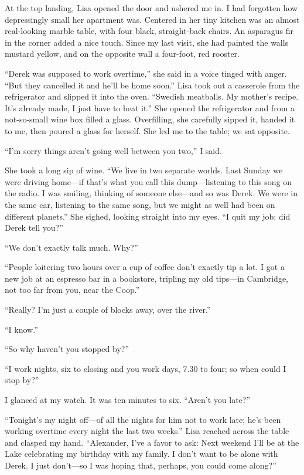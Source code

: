 At the top landing, Lisa opened the door and ushered me in. I had
forgotten how depressingly small her apartment was. Centered in her tiny
kitchen was an almost real-looking marble table, with four black,
straight-back chairs. An asparagus fir in the corner added a nice touch.
Since my last visit, she had painted the walls mustard yellow, and on
the opposite wall a four-foot, red rooster.

``Derek was supposed to work overtime,'' she said in a voice tinged with
anger. ``But they cancelled it and he'll be home soon.'' Lisa took out a
casserole from the refrigerator and slipped it into the oven. ``Swedish
meatballs. My mother's recipe. It's already made, I just have to heat
it.'' She opened the refrigerator and from a not-so-small wine box
filled a glass. Overfilling, she carefully sipped it, handed it to me,
then poured a glass for herself. She led me to the table; we sat
opposite.

``I'm sorry things aren't going well between you two,'' I said.

She took a long sip of wine. ``We live in two separate worlds. Last
Sunday we were driving home---if that's what you call this
dump---listening to this song on the radio. I was smiling, thinking of
someone else---and so was Derek. We were in the same car, listening to
the same song, but we might as well had been on different planets.'' She
sighed, looking straight into my eyes. ``I quit my job; did Derek tell
you?''

``We don't exactly talk much. Why?''

``People loitering two hours over a cup of coffee don't exactly tip a
lot. I got a new job at an espresso bar in a bookstore, tripling my old
tips---in Cambridge, not too far from you, near the Coop.''

``Really? I'm just a couple of blocks away, over the river.''

``I know.''

``So why haven't you stopped by?''

``I work nights, six to closing and you work days, 7.30 to four; so when
could I stop by?''

I glanced at my watch. It was ten minutes to six. ``Aren't you late?''

``Tonight's my night off---of all the nights for him not to work late;
he's been working overtime every night the last two weeks.'' Lisa
reached across the table and clasped my hand. ``Alexander, I've a favor
to ask: Next weekend I'll be at the Lake celebrating my birthday with my
family. I don't want to be alone with Derek. I just don't---so I was
hoping that, perhaps, you could come along?''

